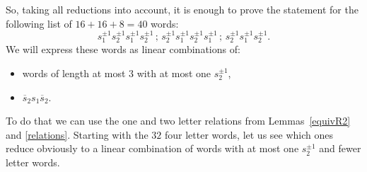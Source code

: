 \documentclass[12pt,reqno]{amsart}
\theoremstyle{definition}
\def\hs{\overline{s}}
\begin{document}
So, taking all reductions into account, it is enough to prove the statement for
the following list of $16+16+8 = 40$ words:
$$
s_1^{\pm 1} s_2^{\pm 1} s_1^{\pm 1}s_2^{\pm 1} \,;\,
s_2^{\pm 1} s_1^{\pm 1}s_2^{\pm 1} s_1^{\pm 1} \,;\, s_2^{\pm 1} s_1^{\pm 1}s_2^{\pm 1} .
$$
We will express these words as linear combinations of:
\begin{itemize}
\item words of length at most 3 with at most one $s_2^{\pm 1}$,
\item $\hs_2 s_1 \hs_2$.
\end{itemize}

To do that we can use the one and two letter relations from Lemmas~\ref{equivR2}
and \ref{relations}. Starting with the $32$ four letter words, let us see which
ones reduce obviously to a linear combination of words with at most one
$s_2^{\pm 1}$ and fewer letter words.\\
\end{document}
